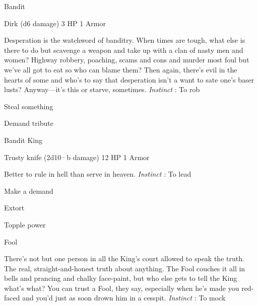 \stopitemize
 
\startMonsterName
Bandit	 
\stopMonsterName
 

Dirk (d6 damage)	3 HP	1 Armor

 


 
\startMonsterDescription
Desperation is the watchword of banditry. When times are tough, what else is there to do but scavenge a weapon and take up with a clan of nasty men and women? Highway robbery, poaching, scams and cons and murder most foul but we’ve all got to eat so who can blame them? Then again, there’s evil in the hearts of some and who’s to say that desperation isn’t a want to sate one’s baser lusts? Anyway—it’s this or starve, sometimes. {\em Instinct} : To rob
\stopMonsterDescription
 
\startitemize[1,packed]

\item Steal something

 
\item Demand tribute


\stopitemize
 
\startMonsterName
Bandit King	 
\stopMonsterName
 

Trusty knife (2d10·b damage)	12 HP	1 Armor

 


 
\startMonsterDescription
Better to rule in hell than serve in heaven. {\em Instinct} : To lead
\stopMonsterDescription
 
\startitemize[1,packed]

\item Make a demand

 
\item Extort

 
\item Topple power


\stopitemize
 
\startMonsterName
Fool	
\stopMonsterName
 
\startMonsterDescription
There’s not but one person in all the King’s court allowed to speak the truth. The real, straight-and-honest truth about anything. The Fool couches it all in bells and prancing and chalky face-paint, but who else gets to tell the King what’s what? You can trust a Fool, they say, especially when he’s made you red-faced and you’d just as soon drown him in a cesspit. {\em Instinct} : To mock
\stopMonsterDescription
 
